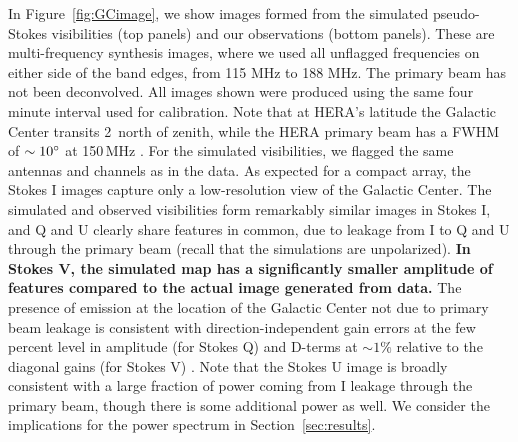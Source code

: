\documentclass[twocolumn, trackchanges]{aastex61}
\newcommand{\edited}[1]{{\bf \color{blue} #1}}
\begin{document}
In Figure~\ref{fig:GCimage}, we show images formed from the simulated
pseudo-Stokes visibilities (top panels) and our observations (bottom panels).
These are multi-frequency synthesis images, where we used all unflagged
frequencies on either side of the band edges, from 115 MHz to 188 MHz.  The
primary beam has not been deconvolved.  All images shown were produced using the
same four minute interval used for calibration.  Note that at HERA's latitude
the Galactic Center transits 2\arcdeg\ north of zenith, while the HERA primary
beam has a FWHM of $\sim10\mbox{$^\circ$}$ at 150\,MHz \citep{Neben.16}. For the
simulated visibilities, we flagged the same antennas and channels as in the
data. As expected for a compact array, the Stokes I images capture only a
low-resolution view of the Galactic Center. The simulated and observed
visibilities form remarkably similar images in Stokes I, and Q and U clearly
share features in common, due to leakage from I to Q and U through the primary
beam (recall that the simulations are unpolarized).  \edited{In Stokes V, the
  simulated map has a significantly smaller amplitude of features compared to
  the actual image generated from data.}  The presence of emission at the
location of the Galactic Center not due to primary beam leakage is consistent
with direction-independent gain errors at the few percent level in amplitude
(for Stokes Q) and D-terms at $\sim 1\%$ relative to the diagonal gains (for
Stokes V) \citep{TMS}.  Note that the Stokes U image is broadly consistent with
a large fraction of power coming from I leakage through the primary beam, though
there is some additional power as well.  We consider the implications for the
power spectrum in Section~\ref{sec:results}.
\end{document}
